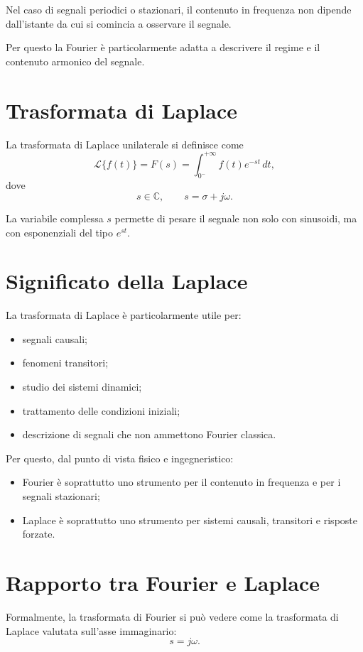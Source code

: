 Nel caso di segnali periodici o stazionari, il contenuto in frequenza non dipende
dall'istante da cui si comincia a osservare il segnale.

Per questo la Fourier è particolarmente adatta a descrivere il regime
e il contenuto armonico del segnale.

\section{Trasformata di Laplace}

La trasformata di Laplace unilaterale si definisce come
\[
\mathcal{L}\{f(t)\}=F(s)
=
\int_{0^-}^{+\infty} f(t)e^{-st}\,dt,
\]
dove
\[
s\in\mathbb{C},
\qquad
s=\sigma+j\omega.
\]

La variabile complessa \(s\) permette di pesare il segnale non solo con sinusoidi,
ma con esponenziali del tipo \(e^{st}\).

\section{Significato della Laplace}

La trasformata di Laplace è particolarmente utile per:
\begin{itemize}
    \item segnali causali;
    \item fenomeni transitori;
    \item studio dei sistemi dinamici;
    \item trattamento delle condizioni iniziali;
    \item descrizione di segnali che non ammettono Fourier classica.
\end{itemize}

Per questo, dal punto di vista fisico e ingegneristico:
\begin{itemize}
    \item Fourier è soprattutto uno strumento per il contenuto in frequenza
    e per i segnali stazionari;
    \item Laplace è soprattutto uno strumento per sistemi causali, transitori
    e risposte forzate.
\end{itemize}

\section{Rapporto tra Fourier e Laplace}

Formalmente, la trasformata di Fourier si può vedere come la trasformata di Laplace
valutata sull'asse immaginario:
\[
s=j\omega.
\]

